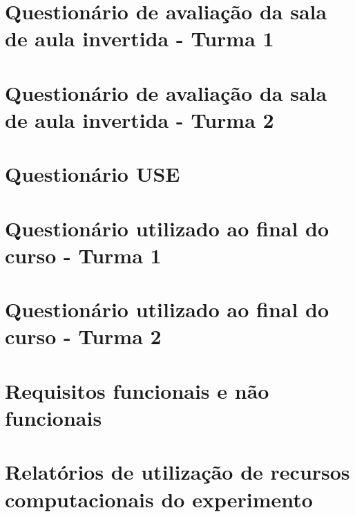 \documentclass[
	12pt,				%
	oneside,			%
	a4paper,			%
	english,			%
	brazil				%
	]{abntex2ppgsi}
\begin{document}
\begin{apendicesenv}
\chapter{Questionário de avaliação da sala de aula invertida - Turma 1}
\label{cap:flipped_classroom_turma_1}


\chapter{Questionário de avaliação da sala de aula invertida - Turma 2}
\label{cap:flipped_classroom_turma_2}


\chapter{Questionário USE}
\label{cap:questionario_use}


\chapter{Questionário utilizado ao final do curso - Turma 1}
\label{cap:questionario_fim_curso_turma1}



\chapter{Questionário utilizado ao final do curso - Turma 2}
\label{cap:questionario_fim_curso_turma2}



\chapter{Requisitos funcionais e não funcionais}
\label{cap:requisitos_f_nf}


\chapter{Relatórios de utilização de recursos computacionais do experimento}
\label{cap:relatorios_uso}


\end{apendicesenv}
\end{document}
